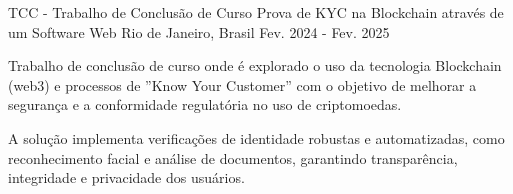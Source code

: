 

\begin{cventries}

  \cventry
    {TCC - Trabalho de Conclusão de Curso} %
    {Prova de KYC na Blockchain através de um Software Web} %
    {Rio de Janeiro, Brasil} %
    {Fev. 2024 - Fev. 2025} %
    {
      \begin{cvitems} %
        \item {Trabalho de conclusão de curso onde é explorado o uso da tecnologia Blockchain (web3) e processos de ”Know Your Customer” com o objetivo de melhorar a segurança e a conformidade regulatória no uso de criptomoedas.}
        \item {A solução implementa verificações de identidade robustas e automatizadas, como reconhecimento facial e análise de documentos, garantindo transparência, integridade e privacidade dos usuários.}
      \end{cvitems}
    }

\end{cventries}
